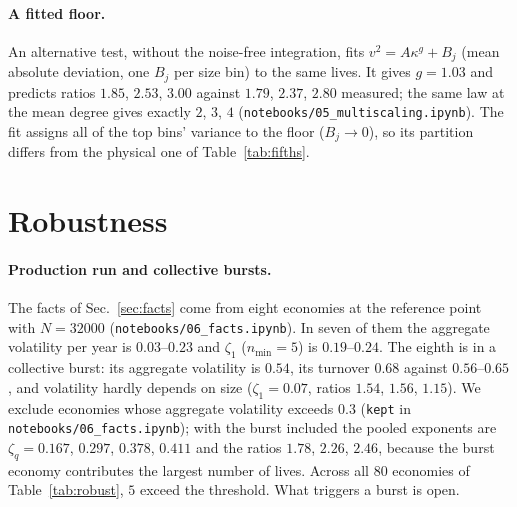 \documentclass[pre,twocolumn,superscriptaddress,nofootinbib]{revtex4-2}
\begin{document}
\paragraph{A fitted floor.}  An alternative test, without the noise-free integration, fits
$v^2=A\kappa^g+B_j$ (mean absolute deviation, one $B_j$ per size bin) to the same lives.  It gives
$g=1.03$ and predicts ratios $1.85$, $2.53$, $3.00$ against $1.79$, $2.37$, $2.80$ measured; the same law at
the mean degree gives exactly $2$, $3$, $4$ (\texttt{notebooks/05\_multiscaling.ipynb}).  The
fit assigns all of the top bins' variance to the floor ($B_j\to0$), so its partition differs from the
physical one of Table~\ref{tab:fifths}.

\section{Robustness}
\label{app:robust}

\paragraph{Production run and collective bursts.}  The facts of Sec.~\ref{sec:facts} come from eight economies
at the reference point with $N=32000$ (\texttt{notebooks/06\_facts.ipynb}).  In seven of them the aggregate
volatility per year is $0.03$--$0.23$ and $\zeta_1$ ($n_{\min}=5$) is $0.19$--$0.24$.  The eighth is in a
collective burst: its aggregate volatility is $0.54$, its turnover $0.68$ against $0.56$--$0.65$, and
volatility hardly depends on size ($\zeta_1=0.07$, ratios $1.54$, $1.56$, $1.15$).  We exclude economies
whose aggregate volatility exceeds $0.3$ (\texttt{kept} in \texttt{notebooks/06\_facts.ipynb}); with the burst included the pooled
exponents are $\zeta_q=0.167$, $0.297$, $0.378$, $0.411$ and the ratios $1.78$, $2.26$, $2.46$, because the burst
economy contributes the largest number of lives.  Across all $80$ economies of
Table~\ref{tab:robust}, $5$ exceed the threshold.  What triggers a burst is open.
\end{document}
